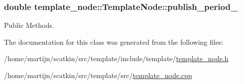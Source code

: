 \subsubsection[{\texorpdfstring{publish\+\_\+period\+\_\+}{publish_period_}}]{\setlength{\rightskip}{0pt plus 5cm}double template\+\_\+node\+::\+Template\+Node\+::publish\+\_\+period\+\_\+}\hypertarget{classtemplate__node_1_1TemplateNode_af85ea62ec4c12e552c4a0c9db66fe28a}{}\label{classtemplate__node_1_1TemplateNode_af85ea62ec4c12e552c4a0c9db66fe28a}


Public Methods. 



The documentation for this class was generated from the following files\+:\begin{DoxyCompactItemize}
\item 
/home/martijn/scatkin/src/template/include/template/\hyperlink{template__node_8h}{template\+\_\+node.\+h}\item 
/home/martijn/scatkin/src/template/src/\hyperlink{template__node_8cpp}{template\+\_\+node.\+cpp}\end{DoxyCompactItemize}
